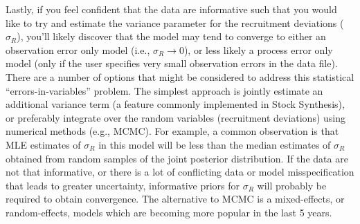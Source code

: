 \documentclass[12pt,letterpaper]{article}
\begin{document}
  Lastly, if you feel confident that the data are informative such that you would like to try and estimate the variance parameter for the recruitment deviations ($\sigma_R$), you'll likely discover that the model may tend to converge to either an observation error only model (i.e., $\sigma_R \rightarrow 0$), or less likely a process error only model (only if the user specifies very small observation errors in the data file).  There are a number of options that might be considered to address this statistical ``errors-in-variables'' problem.  The simplest approach is jointly estimate  an additional variance term (a feature commonly implemented in Stock Synthesis), or preferably integrate over the random variables (recruitment deviations) using numerical methods (e.g., MCMC).  For example, a common observation is that MLE estimates of $\sigma_R$ in this model will be less than the median estimates of $\sigma_R$ obtained from random samples of the joint posterior distribution.  If the data are not that informative, or there is a lot of conflicting data or model misspecification that leads to greater uncertainty, informative priors for $\sigma_R$ will probably be required to obtain convergence.  The alternative to MCMC is a mixed-effects, or random-effects, models which are becoming more popular in the last 5 years.
  \label{sec:summary}
  



  
  
\end{document}
